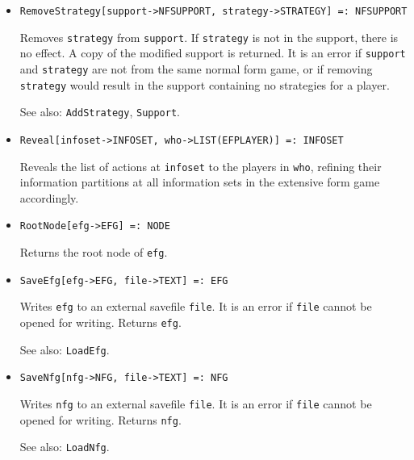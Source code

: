 \begin{itemize}
\item{}
\protect \large \begin{verbatim}
RemoveStrategy[support->NFSUPPORT, strategy->STRATEGY] =: NFSUPPORT 
\end{verbatim}\normalsize

\bd
Removes \verb+strategy+ from \verb+support+.  If \verb+strategy+ is not in
the support, there is no effect.  A copy of the modified support is
returned.  It is an error if \verb+support+ and \verb+strategy+ are
not from the same normal form game, or if removing \verb+strategy+
would result in the support containing no strategies for a player.
\item [See also:] \verb+AddStrategy+, \verb+Support+.
\ed

\item{}
\protect \large \begin{verbatim}
Reveal[infoset->INFOSET, who->LIST(EFPLAYER)] =: INFOSET 
\end{verbatim}\normalsize

\bd
Reveals the list of actions at \verb+infoset+ to the players in \verb+who+,
refining their information partitions at
all information sets in the extensive form game accordingly.  
\ed

\item{}
\protect \large \begin{verbatim}
RootNode[efg->EFG] =: NODE 
\end{verbatim}\normalsize

\bd
Returns the root node of \verb+efg+.
\ed


\item{}
\protect \large \begin{verbatim}
SaveEfg[efg->EFG, file->TEXT] =: EFG 
\end{verbatim}\normalsize

\bd
Writes \verb+efg+ to an external savefile \verb+file+.  It is an error
if \verb+file+ cannot be opened for writing.  Returns \verb+efg+.
\item [See also:] \verb+LoadEfg+.
\ed

\item{}
\protect \large \begin{verbatim}
SaveNfg[nfg->NFG, file->TEXT] =: NFG 
\end{verbatim}\normalsize

\bd
Writes \verb+nfg+ to an external savefile \verb+file+.  It is an
error if \verb+file+ cannot be opened for writing.  Returns \verb+nfg+.
\item [See also:] \verb+LoadNfg+.
\ed


\end{itemize}
